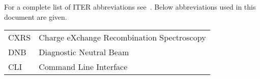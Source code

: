 \documentclass[../main.tex]{subfiles}
\begin{document}
For a complete list of ITER abbreviations see~\cite{iter_abbr}. Below abbreviations used in this document are given.

\begin{table}[ht]
    \begin{tabular}{l l}
        CXRS & Charge eXchange Recombination Spectroscopy \\
        DNB  & Diagnostic Neutral Beam                    \\
        CLI  & Command Line Interface                     \\
    \end{tabular}
\end{table}
\end{document}
